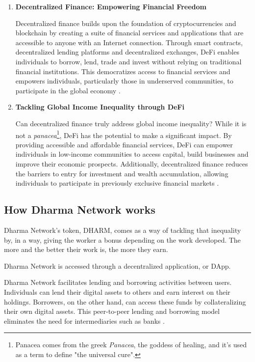 \begin{enumerate}
    \item \textbf{Decentralized Finance: Empowering Financial Freedom}

    Decentralized finance builds upon the foundation of cryptocurrencies and blockchain by creating a suite of financial services and applications that are accessible to anyone with an Internet connection. Through smart contracts, decentralized lending platforms and decentralized exchanges, DeFi enables individuals to borrow, lend, trade and invest without relying on traditional financial institutions. This democratizes access to financial services and empowers individuals, particularly those in underserved communities, to participate in the global economy \cite{twp, cwi, coint}.

    \item \textbf{Tackling Global Income Inequality through DeFi}

    Can decentralized finance truly address global income inequality? While it is not a \textit{panacea}\footnote{Panacea comes from the greek \textit{Panacea}, the goddess of healing, and it's used as a term to define "the universal cure".}, DeFi has the potential to make a significant impact. By providing accessible and affordable financial services, DeFi can empower individuals in low-income communities to access capital, build businesses and improve their economic prospects. Additionally, decentralized finance reduces the barriers to entry for investment and wealth accumulation, allowing individuals to participate in previously exclusive financial markets \cite{twp, cwi, coint}.

    
\end{enumerate}


\subsection{How Dharma Network works}

Dharma Network's token, DHARM, comes as a way of tackling that inequality by, in a way, giving the worker a bonus depending on the work developed. The more and the better their work is, the more they earn.\newline

Dharma Network is accessed through a decentralized application, or DApp.\newline

Dharma Network facilitates lending and borrowing activities between users. Individuals can lend their digital assets to others and earn interest on their holdings. Borrowers, on the other hand, can access these funds by collateralizing their own digital assets. This peer-to-peer lending and borrowing model eliminates the need for intermediaries such as banks \cite{dharma}.\newline

